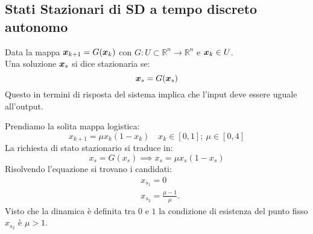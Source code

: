 \subsection{Stati Stazionari di SD a tempo discreto autonomo}%
\label{sub:Stati Stazionari di SD a tempo discreto autonomo}
\begin{defn}
    Data la mappa $\boldsymbol{x}_{k+1}= G(\boldsymbol{x}_k)$ con $G: U \subset \mathbb{R}^n \to \mathbb{R}^n$ e $\boldsymbol{x}_k \in U$.\\
    Una soluzione $\boldsymbol{x}_{s}$ si dice stazionaria se:
    \[
	\boldsymbol{x}_s = G(\boldsymbol{x}_s)
    \] 
    Questo in termini di risposta del sistema implica che l'input deve essere uguale all'output.
\end{defn}
\noindent
\begin{exmp}
    Prendiamo la solita mappa logistica:
    \[
	x_{k+1}= \mu x_k(1-x_k) \quad x_k \in \left[0,1\right]; \ \mu  \in \left[0, 4\right]
    \] 
    La richiesta di stato stazionario si traduce in:
    \[
	x_s = G(x_s) \implies  x_s = \mu x_s(1-x_s)
    \] 
    Risolvendo l'equazione si trovano i candidati:
    \[\begin{aligned}
	&x_{s_1}= 0\\
	& x_{s_2}=\frac{\mu-1}{\mu}
    .\end{aligned}\]
    Visto che la dinamica è definita tra $0$ e $1$ la condizione di esistenza del punto fisso $x_{s_2}$ è $\mu >1$.
\end{exmp}
\noindent

